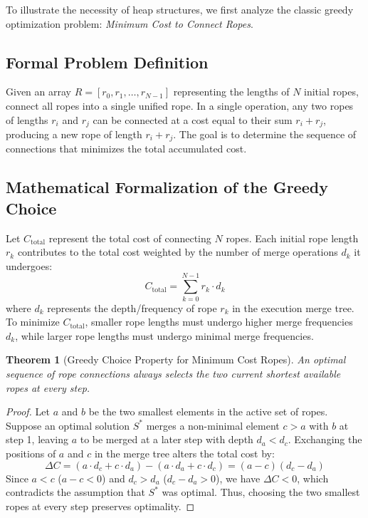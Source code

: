 \documentclass[10pt,journal,compsoc,onecolumn]{IEEEtran}
\newtheorem{theorem}{Theorem}
\begin{document}
To illustrate the necessity of heap structures, we first analyze the classic greedy optimization problem: \emph{Minimum Cost to Connect Ropes}.

\subsection{Formal Problem Definition}
Given an array $R = [r_0, r_1, \dots, r_{N-1}]$ representing the lengths of $N$ initial ropes, connect all ropes into a single unified rope. In a single operation, any two ropes of lengths $r_i$ and $r_j$ can be connected at a cost equal to their sum $r_i + r_j$, producing a new rope of length $r_i + r_j$. The goal is to determine the sequence of connections that minimizes the total accumulated cost.

\subsection{Mathematical Formalization of the Greedy Choice}
Let $C_{\text{total}}$ represent the total cost of connecting $N$ ropes. Each initial rope length $r_k$ contributes to the total cost weighted by the number of merge operations $d_k$ it undergoes:
\[
C_{\text{total}} = \sum_{k=0}^{N-1} r_k \cdot d_k
\]
where $d_k$ represents the depth/frequency of rope $r_k$ in the execution merge tree. To minimize $C_{\text{total}}$, smaller rope lengths must undergo higher merge frequencies $d_k$, while larger rope lengths must undergo minimal merge frequencies.

\begin{theorem}[Greedy Choice Property for Minimum Cost Ropes]
An optimal sequence of rope connections always selects the two current shortest available ropes at every step.
\end{theorem}
\begin{proof}
Let $a$ and $b$ be the two smallest elements in the active set of ropes. Suppose an optimal solution $S^*$ merges a non-minimal element $c > a$ with $b$ at step 1, leaving $a$ to be merged at a later step with depth $d_a < d_c$. Exchanging the positions of $a$ and $c$ in the merge tree alters the total cost by:
\[
\Delta C = (a \cdot d_c + c \cdot d_a) - (a \cdot d_a + c \cdot d_c) = (a - c)(d_c - d_a)
\]
Since $a < c$ ($a - c < 0$) and $d_c > d_a$ ($d_c - d_a > 0$), we have $\Delta C < 0$, which contradicts the assumption that $S^*$ was optimal. Thus, choosing the two smallest ropes at every step preserves optimality.
\end{proof}
\end{document}
